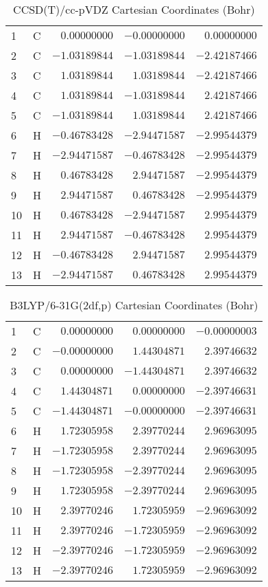 \documentclass[10pt,oneside]{article}
\begin{document}
\begin{table}[h!]
\centering
\caption{CCSD(T)/cc-pVDZ Cartesian Coordinates (Bohr)}
\begin{tabular}{llrrr}
1  & C  & $ 0.00000000$ & $-0.00000000$ & $ 0.00000000$ \\
2  & C  & $-1.03189844$ & $-1.03189844$ & $-2.42187466$ \\
3  & C  & $ 1.03189844$ & $ 1.03189844$ & $-2.42187466$ \\
4  & C  & $ 1.03189844$ & $-1.03189844$ & $ 2.42187466$ \\
5  & C  & $-1.03189844$ & $ 1.03189844$ & $ 2.42187466$ \\
6  & H  & $-0.46783428$ & $-2.94471587$ & $-2.99544379$ \\
7  & H  & $-2.94471587$ & $-0.46783428$ & $-2.99544379$ \\
8  & H  & $ 0.46783428$ & $ 2.94471587$ & $-2.99544379$ \\
9  & H  & $ 2.94471587$ & $ 0.46783428$ & $-2.99544379$ \\
10 & H  & $ 0.46783428$ & $-2.94471587$ & $ 2.99544379$ \\
11 & H  & $ 2.94471587$ & $-0.46783428$ & $ 2.99544379$ \\
12 & H  & $-0.46783428$ & $ 2.94471587$ & $ 2.99544379$ \\
13 & H  & $-2.94471587$ & $ 0.46783428$ & $ 2.99544379$ \\
\end{tabular}
\end{table}

\begin{table}[h!]
\centering
\caption{B3LYP/6-31G(2df,p) Cartesian Coordinates (Bohr)}
\begin{tabular}{llrrr}
1  & C  & $ 0.00000000$ & $ 0.00000000$ & $-0.00000003$ \\
2  & C  & $-0.00000000$ & $ 1.44304871$ & $ 2.39746632$ \\
3  & C  & $ 0.00000000$ & $-1.44304871$ & $ 2.39746632$ \\
4  & C  & $ 1.44304871$ & $ 0.00000000$ & $-2.39746631$ \\
5  & C  & $-1.44304871$ & $-0.00000000$ & $-2.39746631$ \\
6  & H  & $ 1.72305958$ & $ 2.39770244$ & $ 2.96963095$ \\
7  & H  & $-1.72305958$ & $ 2.39770244$ & $ 2.96963095$ \\
8  & H  & $-1.72305958$ & $-2.39770244$ & $ 2.96963095$ \\
9  & H  & $ 1.72305958$ & $-2.39770244$ & $ 2.96963095$ \\
10 & H  & $ 2.39770246$ & $ 1.72305959$ & $-2.96963092$ \\
11 & H  & $ 2.39770246$ & $-1.72305959$ & $-2.96963092$ \\
12 & H  & $-2.39770246$ & $-1.72305959$ & $-2.96963092$ \\
13 & H  & $-2.39770246$ & $ 1.72305959$ & $-2.96963092$ \\
\end{tabular}
\end{table}
\end{document}
